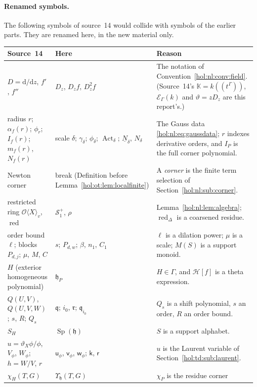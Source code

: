 \documentclass[11pt]{article}
\numberwithin{equation}{section}
\theoremstyle{definition}
\theoremstyle{remark}
\newcommand{\KK}{\mathbb K}
\newcommand{\EK}{\mathcal E_\Gamma(k)}
\newcommand{\Sfam}{\mathcal S}
\newcommand{\red}{\operatorname{red}}
\begin{document}
\paragraph{Renamed symbols.}
The following symbols of source~14 would collide with symbols of the earlier
parts. They are renamed here, in the new material only.
{\small
\begin{longtable}{@{}>{\raggedright\arraybackslash}p{}
>{\raggedright\arraybackslash}p{}
>{\raggedright\arraybackslash}p{}@{}}
\toprule
Source~14 & Here & Reason\\
\midrule
\endhead
$D=\mathrm d/\mathrm dz$, $f'$, $f''$ & $D_z$, $D_zf$, $D_z^2f$ & The
notation of Convention~\ref{hol:nl:conv:field}. (Source~14's $\KK=k((t^\Gamma))$,
$\EK$ and $\vartheta=zD_z$ are this report's.)\\
radius $r$; $\alpha_f(r)$; $\phi_r$; $I_f(r)$; $m_f(r)$, $N_f(r)$ & scale
$\delta$; $\gamma_\delta$; $\phi_\delta$; $\operatorname{Act}_\delta$;
$\underline N_\delta$, $N_\delta$ & The Gauss data \eqref{hol:nl:eq:gaussdata};
$r$ indexes derivative orders, and $I_P$ is the full corner polynomial.\\
Newton corner & break (Definition before
Lemma~\ref{hol:ot:lem:localfinite}) & A \emph{corner} is the finite term
selection of Section~\ref{hol:nl:sub:corner}.\\
restricted ring $\mathcal O\langle X\rangle_v$, $\red$ & $\Sfam_1^+$, $\rho$ &
Lemma~\ref{hol:nl:lem:algebra}; $\red_\Delta$ is a coarsened residue.\\
order bound $\ell$; blocks $P_{d,j}$; $\mu$, $M$, $C$ & $s$; $P_{d,w}$;
$\beta$, $n_1$, $C_1$ & $\ell$ is a dilation power; $\mu$ is a scale; $M(S)$
is a support monoid.\\
$H$ (exterior homogeneous polynomial) & $\mathfrak h_P$ & $H\in\Gamma$, and
$\mathcal H[f]$ is a theta expression.\\
$Q(U,V)$, $Q(U,V,W)$; $s$, $R$; $Q_s$ & $\mathfrak q$; $i_0$, $\mathfrak r$;
$\mathfrak q_{i_0}$ & $Q_s$ is a shift polynomial, $s$ an order, $R$ an order
bound.\\
$S_H$ & $\operatorname{Sp}(\mathfrak h)$ & $S$ is a support alphabet.\\
$u=\vartheta_X\phi/\phi$, $V_\phi$, $W_\phi$; $h=W/V$, $r$ & $\mathsf u_\phi$,
$\mathsf v_\phi$, $\mathsf w_\phi$; $\mathsf k$, $\mathsf r$ & $u$ is the
Laurent variable of Section~\ref{hol:td:sub:laurent}.\\
$\chi_H(T,G)$ & $\Upsilon_{\mathfrak h}(T,G)$ & $\chi_P$ is the residue corner

\end{longtable}}
\end{document}
